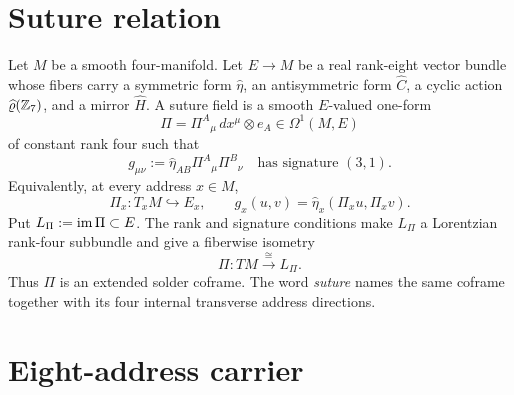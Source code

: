 \documentclass[10pt]{article}
\newcommand{\hateta}{\widehat\eta}
\newcommand{\hatC}{\widehat C}
\newcommand{\hatrho}{\widehat\varrho}
\newcommand{\hatH}{\widehat H}
\newcommand{\Fsol}{\mathcal F_{\rm sol}}
\begin{document}

\begin{abstract}
Spacetime interval and oriented surface flux arise from one rank-four field.
The field sutures the tangent carrier of a Lorentzian manifold into an
eight-address internal carrier. Its symmetric contraction is the metric $g$;
its antisymmetric contraction is the solder flux $\Fsol$. The sevenfold
address action preserves both contractions, while the mirror preserves the
metric and reverses flux orientation. Einstein curvature and Maxwell curvature
meet when the induced flux satisfies the Maxwell field equations under a
declared dimensional calibration.
\end{abstract}

\section{Suture relation}

Let $M$ be a smooth four-manifold. Let $E\to M$ be a real rank-eight vector
bundle whose fibers carry a symmetric form $\hateta$, an antisymmetric form
$\hatC$, a cyclic action $\hatrho(\ZZ_7)$, and a mirror $\hatH$. A suture
field is a smooth $E$-valued one-form
\[
\Pi=\Pi^A{}_{\mu}\,dx^\mu\otimes e_A\in\Omega^1(M,E)
\]
of constant rank four such that
\[
g_{\mu\nu}:=\hateta_{AB}\Pi^A{}_{\mu}\Pi^B{}_{\nu}
\quad\text{has signature }(3,1).
\tag{SF.0}
\]
Equivalently, at every address $x\in M$,
\[
\Pi_x:T_xM\hookrightarrow E_x,
\qquad
g_x(u,v)=\hateta_x(\Pi_xu,\Pi_xv).
\tag{SF.1}
\]
Put $L_\Pi:=\operatorname{im}\Pi\subset E$. The rank and signature conditions make $L_\Pi$ a
Lorentzian rank-four subbundle and give a fiberwise isometry
\[
\Pi:TM\xrightarrow{\ \cong\ }L_\Pi.
\tag{SF.2}
\]
Thus $\Pi$ is an extended solder coframe. The word \emph{suture} names the
same coframe together with its four internal transverse address directions.

\section{Eight-address carrier}

\sharedmatching
\end{document}
